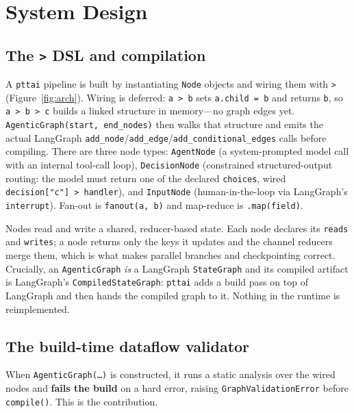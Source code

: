 \documentclass[11pt]{article}
\newcommand{\code}[1]{\texttt{#1}}
\begin{document}
\section{System Design}
\label{sec:design}

\subsection{The \code{>} DSL and compilation}

A \code{pttai} pipeline is built by instantiating \code{Node} objects and wiring
them with \code{>} (Figure~\ref{fig:arch}). Wiring is deferred: \code{a > b} sets
\code{a.child = b} and returns \code{b}, so \code{a > b > c} builds a linked
structure in memory---no graph edges yet. \code{AgenticGraph(start, end\_nodes)}
then walks that structure and emits the actual LangGraph
\code{add\_node}/\code{add\_edge}/\code{add\_conditional\_edges} calls before
compiling. There are three node types:
\code{AgentNode} (a system-prompted model call with an internal tool-call loop),
\code{DecisionNode} (constrained structured-output routing: the model must
return one of the declared \code{choices}, wired \code{decision["c"] > handler}),
and \code{InputNode} (human-in-the-loop via LangGraph's \code{interrupt}). Fan-out
is \code{fanout(a, b)} and map-reduce is \code{.map(field)}.

Nodes read and write a shared, reducer-based state. Each node declares its
\code{reads} and \code{writes}; a node returns only the keys it updates and the
channel reducers merge them, which is what makes parallel branches and
checkpointing correct. Crucially, an \code{AgenticGraph} \emph{is} a LangGraph
\code{StateGraph} and its compiled artifact is LangGraph's
\code{CompiledStateGraph}: \code{pttai} adds a build pass on top of LangGraph and
then hands the compiled graph to it. Nothing in the runtime is reimplemented.

\subsection{The build-time dataflow validator}
\label{sec:validator}

When \code{AgenticGraph(\dots)} is constructed, it runs a static analysis over
the wired nodes and \textbf{fails the build} on a hard error, raising
\code{GraphValidationError} before \code{compile()}. This is the contribution.
\end{document}
